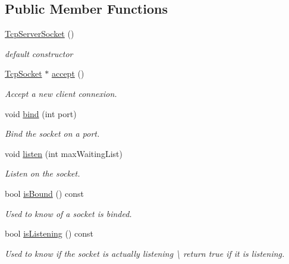 \subsection*{Public Member Functions}
\begin{DoxyCompactItemize}
\item 
\hypertarget{classmognetwork_1_1_tcp_server_socket_a152822e1e60c7085578bc83cdfd00bbf}{\hyperlink{classmognetwork_1_1_tcp_server_socket_a152822e1e60c7085578bc83cdfd00bbf}{Tcp\-Server\-Socket} ()}\label{classmognetwork_1_1_tcp_server_socket_a152822e1e60c7085578bc83cdfd00bbf}

\begin{DoxyCompactList}\small\item\em default constructor \end{DoxyCompactList}\item 
\hyperlink{classmognetwork_1_1_tcp_socket}{Tcp\-Socket} $\ast$ \hyperlink{classmognetwork_1_1_tcp_server_socket_a53a7e104d2024c5d8742d8dc34e7f3a1}{accept} ()
\begin{DoxyCompactList}\small\item\em Accept a new client connexion. \end{DoxyCompactList}\item 
void \hyperlink{classmognetwork_1_1_tcp_server_socket_a4b105d5de7327704053aa1a8cd63867c}{bind} (int port)
\begin{DoxyCompactList}\small\item\em Bind the socket on a port. \end{DoxyCompactList}\item 
void \hyperlink{classmognetwork_1_1_tcp_server_socket_ae7be66e332d204dcec82e252e86231eb}{listen} (int max\-Waiting\-List)
\begin{DoxyCompactList}\small\item\em Listen on the socket. \end{DoxyCompactList}\item 
bool \hyperlink{classmognetwork_1_1_tcp_server_socket_a982378d2a52f5b0c0935887c30dc1304}{is\-Bound} () const 
\begin{DoxyCompactList}\small\item\em Used to know of a socket is binded. \end{DoxyCompactList}\item 
\hypertarget{classmognetwork_1_1_tcp_server_socket_a38a7a113a0d5a541304ac4011229e091}{bool \hyperlink{classmognetwork_1_1_tcp_server_socket_a38a7a113a0d5a541304ac4011229e091}{is\-Listening} () const }\label{classmognetwork_1_1_tcp_server_socket_a38a7a113a0d5a541304ac4011229e091}

\begin{DoxyCompactList}\small\item\em Used to know if the socket is actually listening \textbackslash{} return true if it is listening. \end{DoxyCompactList}\end{DoxyCompactItemize}
